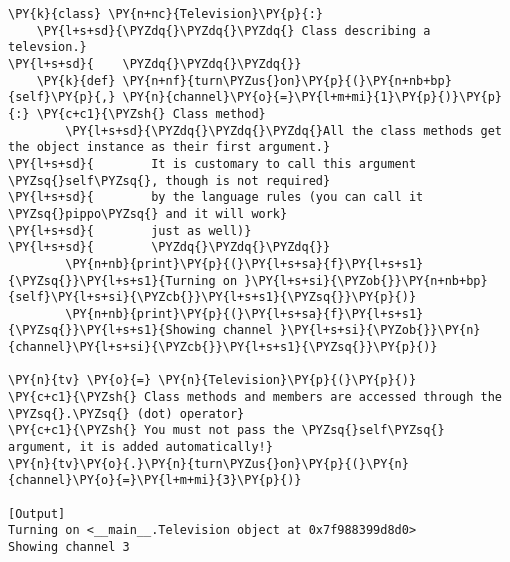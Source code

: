 \begin{Verbatim}[label=\makebox{\url{https://github.com/lucabaldini/cmepda/tree/master/slides/latex/snippets/class\_methods.py}},commandchars=\\\{\}]
\PY{k}{class} \PY{n+nc}{Television}\PY{p}{:}
    \PY{l+s+sd}{\PYZdq{}\PYZdq{}\PYZdq{} Class describing a televsion.}
\PY{l+s+sd}{    \PYZdq{}\PYZdq{}\PYZdq{}}
    \PY{k}{def} \PY{n+nf}{turn\PYZus{}on}\PY{p}{(}\PY{n+nb+bp}{self}\PY{p}{,} \PY{n}{channel}\PY{o}{=}\PY{l+m+mi}{1}\PY{p}{)}\PY{p}{:} \PY{c+c1}{\PYZsh{} Class method}
        \PY{l+s+sd}{\PYZdq{}\PYZdq{}\PYZdq{}All the class methods get the object instance as their first argument.}
\PY{l+s+sd}{        It is customary to call this argument \PYZsq{}self\PYZsq{}, though is not required}
\PY{l+s+sd}{        by the language rules (you can call it \PYZsq{}pippo\PYZsq{} and it will work}
\PY{l+s+sd}{        just as well)}
\PY{l+s+sd}{        \PYZdq{}\PYZdq{}\PYZdq{}}
        \PY{n+nb}{print}\PY{p}{(}\PY{l+s+sa}{f}\PY{l+s+s1}{\PYZsq{}}\PY{l+s+s1}{Turning on }\PY{l+s+si}{\PYZob{}}\PY{n+nb+bp}{self}\PY{l+s+si}{\PYZcb{}}\PY{l+s+s1}{\PYZsq{}}\PY{p}{)}
        \PY{n+nb}{print}\PY{p}{(}\PY{l+s+sa}{f}\PY{l+s+s1}{\PYZsq{}}\PY{l+s+s1}{Showing channel }\PY{l+s+si}{\PYZob{}}\PY{n}{channel}\PY{l+s+si}{\PYZcb{}}\PY{l+s+s1}{\PYZsq{}}\PY{p}{)}

\PY{n}{tv} \PY{o}{=} \PY{n}{Television}\PY{p}{(}\PY{p}{)}
\PY{c+c1}{\PYZsh{} Class methods and members are accessed through the \PYZsq{}.\PYZsq{} (dot) operator}
\PY{c+c1}{\PYZsh{} You must not pass the \PYZsq{}self\PYZsq{} argument, it is added automatically!}
\PY{n}{tv}\PY{o}{.}\PY{n}{turn\PYZus{}on}\PY{p}{(}\PY{n}{channel}\PY{o}{=}\PY{l+m+mi}{3}\PY{p}{)}

[Output]
Turning on <__main__.Television object at 0x7f988399d8d0>
Showing channel 3
\end{Verbatim}
